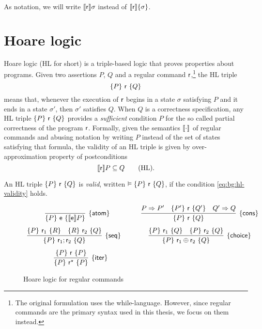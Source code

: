 As notation, we will write $\llbracket\mathsf{r}\rrbracket\sigma$ instead of $\llbracket\mathsf{r}\rrbracket\{\sigma\}$.

\section{Hoare logic}\label{sec:bg:hl}
Hoare logic (HL for short) \cite{Hoare69} is a triple-based logic that proves properties about programs. Given two assertions $P$, $Q$ and a regular command $\mathsf{r}$,\footnote{The original formulation uses the while-language. However, since regular commands are the primary syntax used in this thesis, we focus on them instead.} the HL triple
\[
\{P\}~\mathsf{r}~\{Q\}
\]
means that, whenever the execution of $\mathsf{r}$ begins in a state $\sigma$ satisfying $P$ and it ends in a state $\sigma'$, then $\sigma'$ satisfies $Q$.
When $Q$ is a correctness specification, any HL triple $\{P\}~\mathsf{r}~\{Q\}$ provides a \emph{sufficient} condition $P$ for the so called partial correctness of the program $\mathsf{r}$.
Formally, given the semantics $\llbracket\cdot\rrbracket$ of regular commands and abusing notation by writing $P$ instead of the set of states satisfying that formula, the validity of an HL triple is given by over-approximation property of postconditions
\[
\llbracket\mathsf{r}\rrbracket P \subseteq Q \tag{HL}\label{eq:bg:hl-validity}.
\]

\noindent
An HL triple $\{P\}~\mathsf{r}~\{Q\}$ is \emph{valid}, written $\vDash \{P\}~\mathsf{r}~\{Q\}$, if the condition \eqref{eq:bg:hl-validity} holds.

\begin{figure}[t]
	\centering
	\begin{framed}
		\(
		\begin{array}{cc}
			\infer[\hlrule{atom}]
			{\hltriple{P}{\expe}{\denot{\expe}P}}
			{}
			\quad                     &
			\infer[\hlrule{cons}]
			{\hltriple{P}{\regr}{Q}}
			{P \Rightarrow P'         & \hltriple{P'}{\regr}{Q'}  & Q' \Rightarrow Q}
			\\[7.5pt]
			\infer[\hlrule{seq}]
			{\hltriple{P}{\regr_1;\regr_2}{Q}}
			{\hltriple{P}{\regr_1}{R} & \hltriple{R}{\regr_2}{Q}}
			\qquad                    &
			\infer[\hlrule{choice}]
			{\hltriple{P}{\regr_1 \regplus \regr_2}{Q}}
			{\hltriple{P}{\regr_1}{Q} & \hltriple{P}{\regr_2}{Q}}
			\\[7.5pt]
			\infer[\hlrule{iter}]
			{\hltriple{P}{\regr^\kstar}{P}}
			{\hltriple{P}{\regr}{P}}
		\end{array}
		\)
	\end{framed}
	\vspace{-1ex}
	\caption{Hoare logic for regular commands}\label{fig:bg:hl}
\end{figure}

